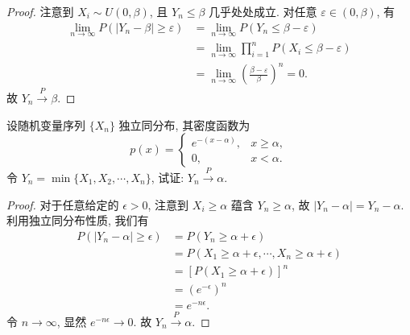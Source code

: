 \documentclass[../main.tex]{subfiles}
\begin{document}
\begin{proof}
  注意到 \(X_i \sim U(0, \beta)\), 且 \(Y_n \le \beta\) 几乎处处成立. 对任意 \(\varepsilon \in (0, \beta)\), 有
\[
\begin{aligned}
\lim_{n \to \infty} P(|Y_n - \beta| \ge \varepsilon) &= \lim_{n \to \infty} P(Y_n \le \beta - \varepsilon) \\
&= \lim_{n \to \infty} \prod_{i=1}^n P(X_i \le \beta - \varepsilon) \\
&= \lim_{n \to \infty} \left( \frac{\beta - \varepsilon}{\beta} \right)^n = 0.
\end{aligned}
\]
故 \(Y_n \xrightarrow{P} \beta\).
\end{proof}

\begin{exercise}{}{}
设随机变量序列 $\{X_n\}$ 独立同分布, 其密度函数为
\[ p(x) = \begin{cases} e^{-(x-\alpha)}, & x \ge \alpha, \\ 0, & x < \alpha. \end{cases} \]
令 $Y_n = \operatorname{min}\{X_1, X_2, \cdots, X_n\}$, 试证: $Y_n \xrightarrow{P} \alpha.$
\end{exercise}
\begin{proof}
  对于任意给定的 \(\epsilon > 0\), 注意到 \(X_i \ge \alpha\) 蕴含 \(Y_n \ge \alpha\), 故 \(|Y_n - \alpha| = Y_n - \alpha\). 利用独立同分布性质, 我们有
\[
\begin{aligned}
P(|Y_n - \alpha| \ge \epsilon) &= P(Y_n \ge \alpha + \epsilon) \\
&= P(X_1 \ge \alpha + \epsilon, \cdots, X_n \ge \alpha + \epsilon) \\
&= \left[ P(X_1 \ge \alpha + \epsilon) \right]^n \\
&= \left( e^{-\epsilon} \right)^n \\
&= e^{-n\epsilon}.
\end{aligned}
\]
令 \(n \to \infty\), 显然 \(e^{-n\epsilon} \to 0\). 故 \(Y_n \xrightarrow{P} \alpha\). 
\end{proof}
\end{document}
